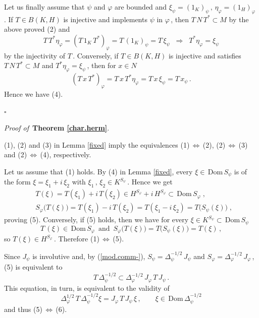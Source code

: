 \documentclass[reqno]{amsart}
\theoremstyle{definition}
\theoremstyle{remark}
\numberwithin{equation}{section}
\theoremstyle{plain}
\begin{document}
Let us finally assume that $\psi$ and $\varphi$ are bounded and
$\xi_\psi =(1_K)_\psi\, ,\,\eta_\varphi =(1_H)_\varphi\,$. If
$T\in B(K,H)$ is injective and implements $\psi$ in $\varphi\,$,
then $T\, N\, T^*\subset M$ by the above proved (2) and
\begin{equation*}
T\, T^*\eta_\varphi =(T\, 1_K\, T^*)_\varphi =T\, (1_K)_\psi =
T\,\xi_\psi \;\;\Longrightarrow\;\; T^*\eta_\varphi =\xi_\psi
\end{equation*}
by the injectivity of $T\,$. Conversely, if $T\in B(K,H)$ is
injective and satisfies $T\, N\, T^*\subset M$ and $T^*\eta_\varphi
=\xi_\psi\,$, then for $x\in N$
\begin{equation*}
(T\, x\, T^*)_\varphi =T\, x\, T^*\eta_\varphi =T\, x\,\xi_\psi
=T\, x_\psi\, .
\end{equation*}
Hence we have (4).

\hfill $\square\quad$
\medskip

{\it Proof of }$\,${\bf Theorem \ref{char.herm}}.
\medskip

(1), (2) and (3) in Lemma \ref{fixed} imply the equivalences
(1)$\,\Leftrightarrow\,$(2), (2)$\,\Leftrightarrow\,$(3) and
(2)$\,\Leftrightarrow\,$(4), respectively.

Let us assume that (1) holds.
By (4) in Lemma \ref{fixed}, every $\xi\in\,$Dom$\, S_\psi$ is of the
form $\xi =\xi_1 +i\,\xi_2$ with $\xi_1\, ,\,\xi_2\in K^{S_\psi}\,$.
Hence we get
\begin{align*}
&T(\xi )=T(\xi_1 )+i\, T(\xi_2 )\in H^{S_\varphi} +i\, H^{S_\varphi}
\subset\,\text{Dom}\, S_\varphi\; , \\
&S_\varphi\big( T(\xi )\big) =T(\xi_1 )-i\, T(\xi_2 )=T(\xi_1 -i\,
\xi_2 ) =T\big( S_\psi (\xi )\big)\; ,
\end{align*}
proving (5). Conversely, if (5) holds, then we have for every
$\xi\in K^{S_\psi}\subset\,\text{Dom}\, S_\psi$
\begin{equation*}
T\, (\xi )\in\,\text{Dom}\, S_\varphi\,\text{ and }\,S_\varphi
\big( T(\xi )\big) =T\big( S_\psi (\xi )\big) =T(\xi )\, ,
\end{equation*}
so $T(\xi )\in H^{S_\varphi}\,$. Therefore (1)$\,\Leftrightarrow
\,$(5).

Since $J_\psi$ is involutive and, by (\ref{mod.comm-}), $S_\psi =
\Delta_\psi^{-1/2}\, J_\psi$ and $S_\varphi =\Delta_\varphi^{-1/2}\,
J_\varphi\,$, (5) is equivalent to
\begin{equation*}
T\,\Delta_\psi^{-1/2}\subset \Delta_\varphi^{-1/2}\, J_\varphi\, T\,
J_\psi\, .
\end{equation*}
This equation, in turn, is equivalent to the validity of
\begin{equation*}
\Delta_\varphi^{1/2}\, T\,\Delta_\psi^{-1/2}\xi =J_\varphi\, T\,
J_\psi\,\xi\, ,\qquad \xi\in\,\text{Dom}\,\Delta_\psi^{-1/2}
\end{equation*}
and thus (5)$\,\Leftrightarrow\,$(6).
\end{document}
